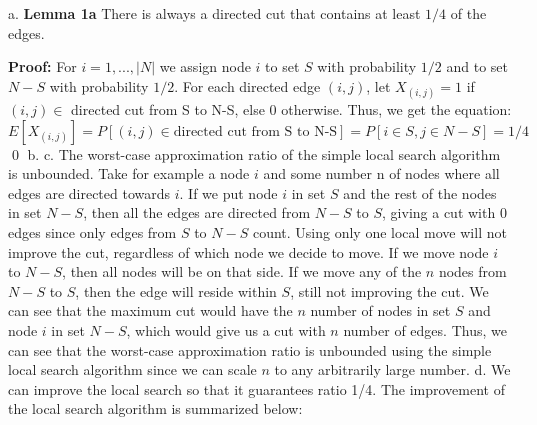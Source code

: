 \documentclass[oneside]{homework} %
\begin{document}
\maketitle
\skipevenpage

{\large a.} \textbf{Lemma 1a} There is always a directed cut that contains at least $1/4$ of the edges.
\newline

\textbf{Proof:} For $i = 1,...,|N|$ we assign node $i$ to set $S$ with probability $1/2$ and to set $N-S$ with probability $1/2$. For each directed edge $(i, j)$, let $X_{(i,j)} = 1$ if $(i, j) \in$ directed cut from S to N-S, else 0 otherwise. Thus, we get the equation: $$E[X_{(i,j)}] = P[(i,j) \in \text{directed cut from S to N-S}] = P[i \in S, j \in N-S] = 1/4$$ \hfill\qed
\newline
\newline
{\large b.} 
\newline
\newline
{\large c.} The worst-case approximation ratio of the simple local search algorithm is unbounded. Take for example a node $i$ and some number n of nodes where all edges are directed towards $i$. If we put node $i$ in set $S$ and the rest of the nodes in set $N-S$, then all the edges are directed from $N-S$ to $S$, giving a cut with 0 edges since only edges from $S$ to $N-S$ count. Using only one local move will not improve the cut, regardless of which node we decide to move. If we move node $i$ to $N-S$, then all nodes will be on that side. If we move any of the $n$ nodes from $N-S$ to $S$, then the edge will reside within $S$, still not improving the cut. We can see that the maximum cut would have the $n$ number of nodes in set $S$ and node $i$ in set $N-S$, which would give us a cut with $n$ number of edges. Thus, we can see that the worst-case approximation ratio is unbounded using the simple local search algorithm since we can scale $n$ to any arbitrarily large number.
\newline
\newline
{\large d.} We can improve the local search so that it guarantees ratio 1/4. The improvement of the local search algorithm is summarized below:
\newline
\newline
\end{document}
